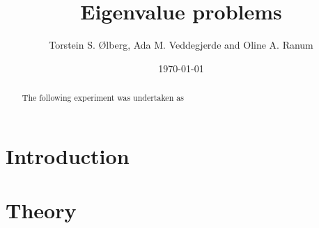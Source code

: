 \documentclass[%
reprint,
amsmath,amssymb,
aps,
]{revtex4-1}
\begin{document}
\title{Eigenvalue problems}
\author{Torstein S. Ølberg, Ada M. Veddegjerde and Oline A. Ranum}
\date{\today}


\begin{abstract}
	The following experiment was undertaken as
\end{abstract}
\maketitle

\section*{Introduction}


\section*{Theory}
\end{document}
